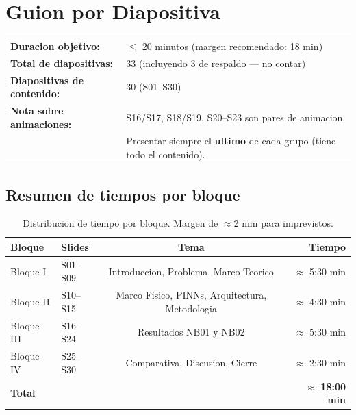 \section{Guion por Diapositiva}

\begin{tcolorbox}[colback=ujatblue!10, colframe=ujatblue,
  title={\bfseries Informacion general de la presentacion}, coltitle=white]
\begin{tabular}{@{}ll@{}}
\textbf{Duracion objetivo:} & $\leq$ 20 minutos (margen recomendado: 18 min) \\
\textbf{Total de diapositivas:} & 33 (incluyendo 3 de respaldo --- no contar) \\
\textbf{Diapositivas de contenido:} & 30 (S01--S30) \\
\textbf{Nota sobre animaciones:} & S16/S17, S18/S19, S20--S23 son pares de animacion. \\
& Presentar siempre el \textbf{ultimo} de cada grupo (tiene todo el contenido). \\
\end{tabular}
\end{tcolorbox}

\subsection{Resumen de tiempos por bloque}

\begin{table}[h!]
\centering
\begin{tabular}{@{}llcr@{}}
\toprule
\textbf{Bloque} & \textbf{Slides} & \textbf{Tema} & \textbf{Tiempo} \\
\midrule
Bloque I  & S01--S09 & Introduccion, Problema, Marco Teorico & $\approx$ 5:30 min \\
Bloque II & S10--S15 & Marco Fisico, PINNs, Arquitectura, Metodologia & $\approx$ 4:30 min \\
Bloque III & S16--S24 & Resultados NB01 y NB02 & $\approx$ 5:30 min \\
Bloque IV & S25--S30 & Comparativa, Discusion, Cierre & $\approx$ 2:30 min \\
\midrule
\textbf{Total} & & & $\approx$ \textbf{18:00 min} \\
\bottomrule
\end{tabular}
\caption{Distribucion de tiempo por bloque. Margen de $\approx$2 min para imprevistos.}
\end{table}

